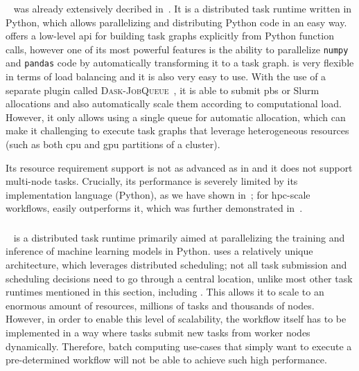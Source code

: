 \subsubsection*{\dask}
\dask~\cite{dask} was already extensively decribed in~. It is a
distributed task runtime written in Python, which allows parallelizing and distributing Python code
in an easy way. \dask{} offers a low-level \gls{api} for building
task graphs explicitly from Python function calls, however one of its most powerful features is the
ability to parallelize \texttt{numpy} and \texttt{pandas} code by automatically
transforming it to a task graph. \dask{} is very flexible in terms of load
balancing and it is also very easy to use. With the use of a separate plugin called
\textsc{Dask-JobQueue}~\cite{dask-jobqueue}, it is able to submit \gls{pbs} or
Slurm allocations and also automatically scale them according to computational load. However, it
only allows using a single queue for automatic allocation, which can make it challenging to execute
task graphs that leverage heterogeneous resources (such as both \gls{cpu} and
\gls{gpu} partitions of a cluster).

Its resource requirement support is not as advanced as in \hyperqueue{} and it does not
support multi-node tasks. Crucially, its performance is severely limited by its implementation
language (Python), as we have shown in~; for \gls{hpc}-scale
workflows, \hyperqueue{} easily outperforms it, which was further demonstrated
in~.

\subsubsection*{\ray}
\ray~\cite{ray} is a distributed task runtime primarily aimed at parallelizing the
training and inference of machine learning models in Python. \ray{} uses a
relatively unique architecture, which leverages distributed scheduling; not all task submission and
scheduling decisions need to go through a central location, unlike most other task runtimes
mentioned in this section, including \hyperqueue{}. This allows it to scale to an
enormous amount of resources, millions of tasks and thousands of nodes. However, in order to enable
this level of scalability, the workflow itself has to be implemented in a way where tasks submit
new tasks from worker nodes dynamically. Therefore, batch computing use-cases that simply want to
execute a pre-determined workflow will not be able to achieve such high performance.

